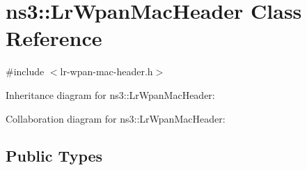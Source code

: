 \hypertarget{classns3_1_1LrWpanMacHeader}{}\section{ns3\+:\+:Lr\+Wpan\+Mac\+Header Class Reference}
\label{classns3_1_1LrWpanMacHeader}


{\ttfamily \#include $<$lr-\/wpan-\/mac-\/header.\+h$>$}



Inheritance diagram for ns3\+:\+:Lr\+Wpan\+Mac\+Header\+:


Collaboration diagram for ns3\+:\+:Lr\+Wpan\+Mac\+Header\+:
\subsection*{Public Types}
